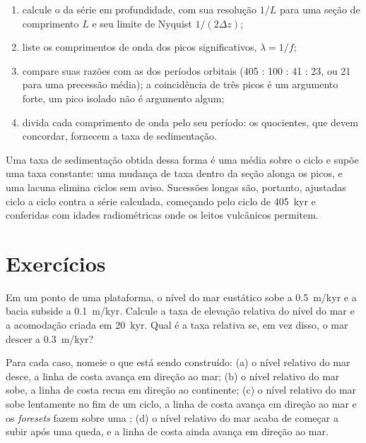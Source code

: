 \begin{method}\label{met:b3:sequence-stratigraphy:cycles}
\begin{enumerate}
\item calcule o  da série em profundidade, com sua resolução
  $1/L$ para uma seção de comprimento $L$ e seu limite de Nyquist $1/(2\Delta z)$;
\item liste os comprimentos de onda dos picos significativos, $\lambda = 1/f$;
\item compare suas razões com as dos períodos orbitais (405 : 100 : 41
  : 23, ou 21 para uma precessão média); a coincidência de três picos é um argumento forte,
  um pico isolado não é argumento algum;
\item divida cada comprimento de onda pelo seu período: os quocientes, que devem
  concordar, fornecem a taxa de sedimentação.
\end{enumerate}
\end{method}

Uma taxa de sedimentação obtida dessa forma é uma média sobre o ciclo e
supõe uma taxa constante: uma mudança de taxa dentro da seção alonga os
picos, e uma lacuna elimina ciclos sem aviso. Sucessões longas são, portanto,
ajustadas ciclo a ciclo contra a série calculada, começando pelo ciclo de \qty{405}{kyr}
e conferidas com idades radiométricas onde os leitos vulcânicos permitem.

\section{Exercícios}

\begin{exercise}[$\star$]\label{exo:b3:sequence-stratigraphy:1}
Em um ponto de uma plataforma, o nível do mar eustático sobe a \qty{0.5}{m/kyr} e
a bacia subside a \qty{0.1}{m/kyr}. Calcule a taxa de elevação relativa
do nível do mar e a acomodação criada em \qty{20}{kyr}. Qual é a
taxa relativa se, em vez disso, o mar descer a \qty{0.3}{m/kyr}?
\end{exercise}

\begin{exercise}[$\star$]\label{exo:b3:sequence-stratigraphy:2}
Para cada caso, nomeie o  que está sendo construído: (a) o nível relativo do mar
desce, a linha de costa avança em direção ao mar; (b) o nível relativo do mar sobe, a
linha de costa recua em direção ao continente; (c) o nível relativo do mar sobe lentamente no fim de um
ciclo, a linha de costa avança em direção ao mar e os \textit{foresets} fazem  sobre uma
; (d) o nível relativo do mar acaba de começar a subir após uma
queda, e a linha de costa ainda avança em direção ao mar.
\end{exercise}

